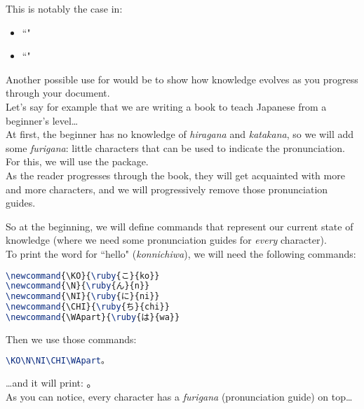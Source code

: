This is notably the case in:
\begin{itemize}
	\item ``"
	\item ``"
\end{itemize}




\bigskip


Another possible use for  would be to show how knowledge evolves as you progress through your document. \\

Let's say for example that we are writing a book to teach Japanese from a beginner's level\dots \\

At first, the beginner has no knowledge of \emph{hiragana} and \emph{katakana}, so we will add some \emph{furigana}: little characters that can be used to indicate the pronunciation. For this, we will use the  package. \\

As the reader progresses through the book, they will get acquainted with more and more characters, and we will progressively remove those pronunciation guides.

So at the beginning, we will define commands that represent our current state of knowledge (where we need some pronunciation guides for \emph{every} character). \\

To print the word for ``hello" (\emph{konnichiwa}), we will need the following commands:
\begin{lstlisting}[language=tex]
\newcommand{\KO}{\ruby{こ}{ko}}
\newcommand{\N}{\ruby{ん}{n}}
\newcommand{\NI}{\ruby{に}{ni}}
\newcommand{\CHI}{\ruby{ち}{chi}}
\newcommand{\WApart}{\ruby{は}{wa}}
\end{lstlisting}

\newcommand{\KO}{\ruby{こ}{ko}}
\newcommand{\N}{\ruby{ん}{n}}
\newcommand{\NI}{\ruby{に}{ni}}
\newcommand{\CHI}{\ruby{ち}{chi}}
\newcommand{\WApart}{\ruby{は}{wa}}

Then we use those commands:
\begin{lstlisting}[language=tex]
\KO\N\NI\CHI\WApart。
\end{lstlisting}

\dots and it will print: \KO\N\NI\CHI\WApart。\\

As you can notice, every character has a \emph{furigana} (pronunciation guide) on top\dots \\


